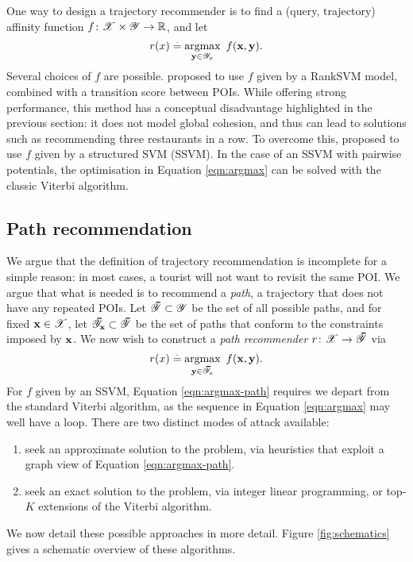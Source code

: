 One way to design a trajectory recommender is to find a (query, trajectory) affinity function $f \colon \mathscr{X} \times \mathscr{Y} \to \mathbb{R}$, and let
\begin{equation}
	\label{eqn:argmax}
	r( x ) \stackrel{.}{=} \operatorname*{argmax}_{\mathbf{y} \in \mathscr{Y}_x}~f(\mathbf{x}, \mathbf{y}).
\end{equation}
Several choices of $f$ are possible.
\citet{cikm16paper} proposed to use $f$ given by a RankSVM model, combined with a transition score between POIs.
While offering strong performance, this method has a conceptual disadvantage highlighted in the previous section:
it does not model global cohesion, and thus can lead to solutions such as recommending three restaurants in a row.
To overcome this, \citet{Chen:2017} proposed to use $f$ given by a structured SVM (SSVM).
In the case of an SSVM with pairwise potentials, the optimisation in Equation \ref{eqn:argmax} can be solved with the classic Viterbi algorithm.


%
\subsection{Path recommendation}

We argue that the definition of trajectory recommendation is incomplete for a simple reason:
in most cases, a tourist will not want to revisit the same POI.
We argue that what is needed is to recommend a \emph{path}, \ie a trajectory that does not have any repeated POIs.
Let $\thickbar{\YCal} \subset \YCal$ be the set of all possible paths,
and for fixed $\mathbf{x} \in \mathscr{X}$, let $\thickbar{\YCal}_{\x} \subset \thickbar{\YCal}$ be the set of paths that conform to the constraints imposed by $\mathbf{x}$.
We now wish to construct a \emph{path recommender} $r \colon \XCal \to \thickbar{\YCal}$ via
\begin{equation}
	\label{eqn:argmax-path}
	r( x ) \defEq \argmax_{\y \in \thickbar{\YCal}_x}~f(\x, \y).
\end{equation}
For $f$ given by an SSVM, Equation \ref{eqn:argmax-path} requires we depart from the standard Viterbi algorithm, as the sequence in Equation \ref{eqn:argmax} may well have a loop.
There are two distinct modes of attack available:
\begin{enumerate}
	\item seek an approximate solution to the problem,
	via heuristics that exploit a graph view of Equation \ref{eqn:argmax-path}.

	\item seek an exact solution to the problem,
	via integer linear programming,
	or top-$K$ extensions of the Viterbi algorithm. %
\end{enumerate}
We now detail these possible approaches in more detail.
Figure \ref{fig:schematics} gives a schematic overview of these algorithms.


